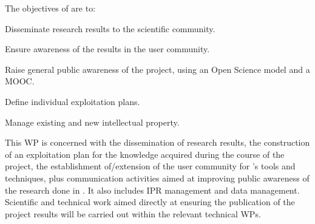 \addtocounter{wpno}{1}
\begin{Workpackage}{\thewpno}
\WPTitle{\wpname{\thewpno}}

\begin{WPObjectives}
The objectives of \theWP{} are to:
\begin{compactitem}
  \item Disseminate research results to the scientific community.
  \item Ensure awareness of the results in the user community.
  \item Raise general public awareness of the \TheProject{} project, using an Open Science model and a MOOC.
  \item Define individual exploitation plans.
  \item Manage existing and new intellectual property.
\end{compactitem}
\end{WPObjectives}

\begin{WPDescription}
This WP is concerned with the dissemination of research results, the construction of an exploitation plan for the knowledge acquired during the course of the \TheProject{} project, 
the establishment of/extension of the user community for \TheProject{}'s tools and techniques,
plus communication activities aimed at improving public awareness of the research done in \TheProject{}.
It also includes IPR management and data management.
Scientific and technical work aimed directly at ensuring the publication of the project results will be carried out within the relevant technical WPs.
\end{WPDescription}

\begin{Task}


\end{Task}
\end{Workpackage}

